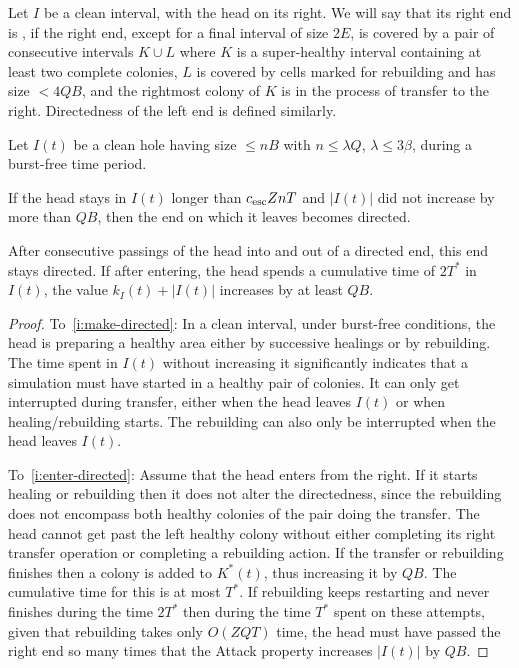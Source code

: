\documentclass[11pt]{memoir}
\theoremstyle{definition} %
\renewcommand{\le}{\leq}
\def\B{B}
\newcommand{\E}{E}
\newcommand{\Q}{Q}
\newcommand{\Tu}{T}
\newcommand{\Tus}{T^{*}}
\newcommand{\Z}{Z}
\newcommand{\cns}[1]{c_{\textrm{\upshape #1}}}
\newcommand{\CEsc}{\cns{esc}}
\begin{document}
\begin{definition}\label{def:super-healthy-end}
  Let \( I \) be a clean interval, with the head on its right.
  We will say that its right end is , if
  the right end, except for a final interval of size \( 2\E \), is covered by a pair of consecutive intervals \( K\cup L \)
  where \( K \) is a super-healthy interval containing at least two complete colonies, \( L \) is
  covered by cells marked for rebuilding and has size \( < 4\Q\B \),
  and the rightmost colony of \( K \) is in the process of transfer to the right.
  Directedness of the left end is defined similarly.
\end{definition}

\begin{lemma}\label{lem:directed-end}
  Let \( I(t) \) be a clean hole having size \( \le n\B \) with \( n\le\lambda\Q \), \( \lambda\le 3\beta \),
during a burst-free time period.
\begin{alphenum}
  \item\label{i:make-directed}
If the head stays in \( I(t) \) longer than 
\( \CEsc\Z n\Tu \) and \( |I(t)| \) did not increase by more than \( \Q\B \),
then the end on which it leaves becomes directed.
\item\label{i:enter-directed}
After consecutive passings of the head into and out of a directed end, this end stays directed.
 If after entering, the head spends a cumulative time of \( 2\Tus \) in \( I(t) \),
the value \( k_{I}(t)+|I(t)| \) increases by at least \( \Q\B \).
\end{alphenum}
\end{lemma}
\begin{proof}
  To~\eqref{i:make-directed}:
  In a clean interval, under burst-free conditions, the head is preparing a healthy area either by
  successive healings or by rebuilding.
  The time spent in \( I(t) \) without increasing it significantly indicates that
  a simulation must have started in a  healthy pair of colonies.
  It can only get interrupted during transfer, either when the head leaves \( I(t) \) or when
  healing/rebuilding starts.
  The rebuilding can also only be interrupted when the head leaves \( I(t) \).

  To~\eqref{i:enter-directed}:
  Assume that the head enters from the right.
  If it starts healing or rebuilding then it does not alter the directedness, since the rebuilding does not encompass
  both healthy colonies of the pair doing the transfer.
  The head
  cannot get past the left healthy colony without either completing its right transfer operation
  or completing a rebuilding action.
  If the transfer or rebuilding finishes then a colony is added to \( K^{*}(t) \), thus increasing it by \( \Q\B \).
  The cumulative time for this is at most \( \Tus \).
  If rebuilding keeps restarting and never finishes during the time \( 2\Tus \) then during the time \( \Tus \)
  spent on these attempts, given that rebuilding takes only \( O(\Z\Q\Tu) \) time,
  the head must have passed the right end so many times that the Attack property increases \( |I(t)| \) by \( \Q\B \).  
\end{proof}
\end{document}
